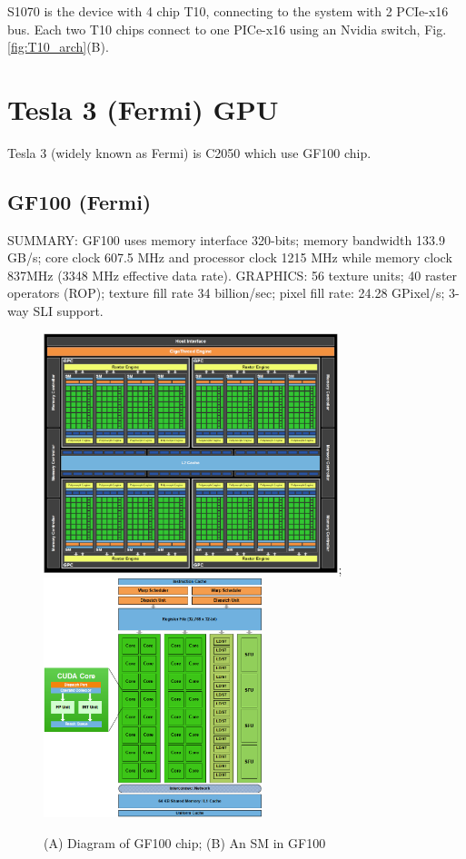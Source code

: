S1070 is the device with 4 chip T10, connecting to the system with 2 PCIe-x16
bus. Each two T10 chips connect to one PICe-x16 using an Nvidia switch,
Fig.\ref{fig:T10_arch}(B).
% 

\section{Tesla 3 (Fermi) GPU}

Tesla 3 (widely known as Fermi) is C2050 which use GF100 chip.

\subsection{GF100 (Fermi)}
\label{sec:gf100-fermi}

SUMMARY: GF100 uses memory interface    320-bits; memory bandwidth 133.9 GB/s;
core clock 607.5 MHz and processor    clock 1215 MHz while memory clock 837MHz (3348 MHz
effective data rate).    GRAPHICS: 56 texture units; 40 raster operators (ROP);
texture fill rate 34    billion/sec; pixel fill rate: 24.28 GPixel/s; 3-way SLI
support.


\begin{figure}[hbt]
  \centerline{\includegraphics[height=7cm,
    angle=0]{./images/gf100.eps}; \includegraphics[height=7cm,
    angle=0]{./images/gf100_sm.eps}}
\caption{(A) Diagram of GF100 chip; (B) An SM in GF100}
\label{fig:gf100}
\end{figure}

